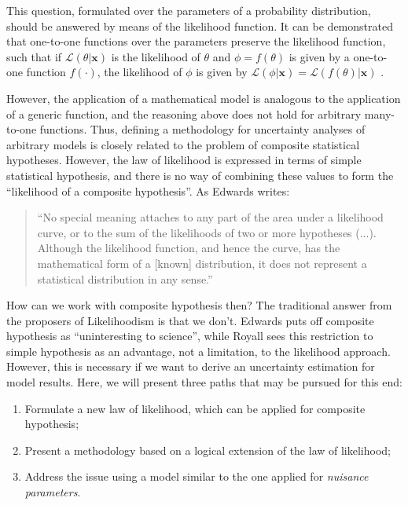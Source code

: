 \documentclass[twoside,12pt,a4paper]{article}
\newcommand{\bu}[1]{\mbox{$\mathbf{#1}$}}
\begin{document}
This question, formulated over the parameters of a probability distribution, should be 
answered by means of the likelihood function. It can be demonstrated that one-to-one functions over the
parameters preserve the likelihood function, such that if $\mathcal{L}(\theta|\bu{x})$ is the likelihood
of $\theta$ and $\phi = f(\theta)$ is given by a one-to-one function $f(\cdot)$, the 
likelihood of $\phi$ is given by 
$\mathcal{L}(\phi|\bu{x}) = \mathcal{L} \left(f(\theta)|\bu{x}\right)$ \citep{Edwards72}.

However, the application of a mathematical model is analogous to the application of a generic function, 
and the reasoning above does not hold for arbitrary many-to-one functions. Thus, defining a methodology
for uncertainty analyses of arbitrary models is closely related to the problem of composite statistical
hypotheses. However, the law of likelihood is expressed in terms of simple statistical hypothesis, and there
is no way of combining these values to form the ``likelihood of a composite hypothesis''. As Edwards writes:

\begin{quote}
``No special meaning attaches to any part of the area under a likelihood curve, or to the sum of the likelihoods of two or more
hypotheses (...).
Although the likelihood function, and hence the curve, has the mathematical form of a [known] distribution, it does not
represent a statistical distribution in any sense.'' \citep{Edwards72}
\end{quote}

How can we work with composite hypothesis then? The traditional answer from the proposers of Likelihoodism is
that we don't. Edwards puts off composite hypothesis as ``uninteresting to science'', while Royall sees
this restriction to simple hypothesis as an advantage, not a limitation, to the likelihood approach.
However, this is necessary if we want to derive an uncertainty estimation for model results.
Here, we will present three paths that may be pursued for this end:

\begin{enumerate}
	\item Formulate a new law of likelihood, which can be applied for composite hypothesis;\label{i:alt}
	\item Present a methodology based on a logical extension of the law of likelihood;\label{i:ext}
	\item Address the issue using a model similar to the one applied for {\em nuisance parameters}. \label{i:prof}
\end{enumerate}
\end{document}
